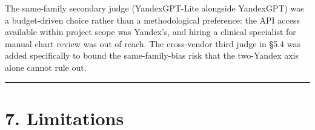 \documentclass[
  american,
  a4paper,
]{article}
\begin{document}
The same-family secondary judge (YandexGPT-Lite alongside YandexGPT) was
a budget-driven choice rather than a methodological preference: the API
access available within project scope was Yandex's, and hiring a
clinical specialist for manual chart review was out of reach. The
cross-vendor third judge in §5.4 was added specifically to bound the
same-family-bias risk that the two-Yandex axis alone cannot rule out.

\begin{center}\rule{0.5\linewidth}{0.5pt}\end{center}

\section{7. Limitations}\label{limitations}
\end{document}
